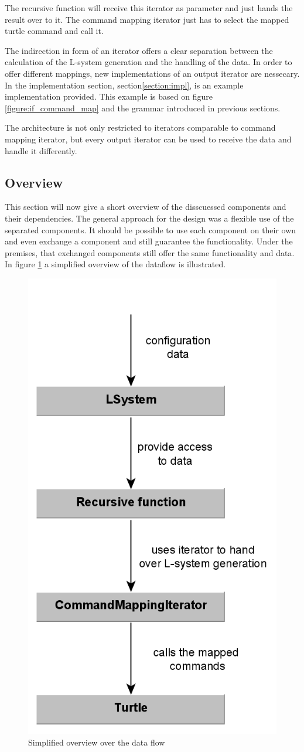 \documentclass[english]{cpp-hmwk}
\begin{document}
The recursive function will receive this iterator as parameter and just hands the result over to it. The command mapping iterator just has to select the mapped turtle command and call it.

The indirection in form of an iterator offers a clear separation between the calculation of the L-system generation and the handling of the data. In order to offer different mappings, new implementations of an output iterator are nessecary. In the implementation section, section\ref{section:impl}, is an example implementation provided. This example is based on figure \ref{figure:if_command_map} and the grammar introduced in previous sections.

The architecture is not only restricted to iterators comparable to command mapping iterator, but every output iterator can be used to receive the data and handle it differently.

\subsection{Overview}
This section will now give a short overview of the disscuessed components and their dependencies. The general approach for the design was a flexible use of the separated components. It should be possible to use each component on their own and even exchange a component and still guarantee the functionality. Under the premises, that exchanged components still offer the same functionality and data. In figure \ref{figure:overview} a simplified overview of the dataflow is illustrated. 

\begin{figure}[h!]
	\centering
	\includegraphics[width=0.4\columnwidth]{../graphs/LSystem/examples/overview.png}
	\caption{Simplified overview over the data flow}
	\label{figure:overview}
\end{figure}
\end{document}
